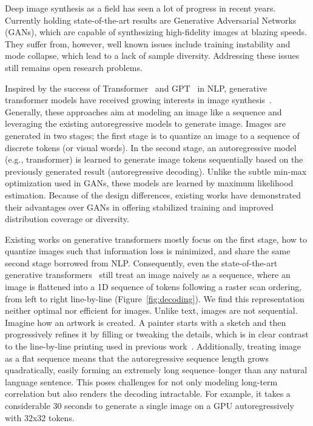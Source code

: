 Deep image synthesis as a field has seen a lot of progress in recent years. Currently holding state-of-the-art results are Generative Adversarial Networks (GANs), which are capable of synthesizing high-fidelity images at blazing speeds. They suffer from, however, well known issues include training instability and mode collapse, which lead to a lack of sample diversity. Addressing these issues still remains open research problems.

Inspired by the success of Transformer~\cite{Vaswani17attention} and GPT~\cite{gpt3} in NLP, generative transformer models have received  growing interests in image synthesis~\cite{chen2020imagegpt,Esser21vqgan,Razavi19vqvae2}. Generally, these approaches aim at modeling an image like a sequence and leveraging the existing autoregressive models to generate image. Images are generated in two stages; the first stage is to quantize an image to a sequence of discrete tokens (or visual words). In the second stage, an autoregressive model (e.g., transformer) is learned to generate image tokens sequentially based on the previously generated result (\ie autoregressive decoding). Unlike the subtle min-max optimization used in GANs, these models are learned by maximum likelihood estimation. Because of the design differences, existing works have demonstrated their advantages over GANs in offering stabilized training and improved distribution coverage or diversity.

Existing works on generative transformers mostly focus on the first stage, \ie how to quantize images such that information loss is minimized, and share the same second stage borrowed from NLP. Consequently, even the state-of-the-art generative transformers~\cite{Esser21vqgan,Ramesh21dalle} still treat an image naively as a sequence, where an image is flattened into a 1D sequence of tokens following a raster scan ordering, \ie from left to right line-by-line (\cf Figure~\ref{fig:decoding}). We find this representation neither optimal nor efficient for images. Unlike text, images are not sequential. Imagine how an artwork is created. A painter starts with a sketch and then progressively refines it by filling or tweaking the details, which is in clear contrast to the line-by-line printing used in previous work~\cite{chen2020imagegpt,Esser21vqgan}. Additionally, treating image as a flat sequence means that the autoregressive sequence length grows quadratically, easily forming an extremely long sequence--longer than any natural language sentence. This poses challenges for not only modeling long-term correlation but also renders the decoding intractable.  For example, it takes a considerable 30 seconds to generate a single image on a GPU autoregressively with 32x32 tokens.

